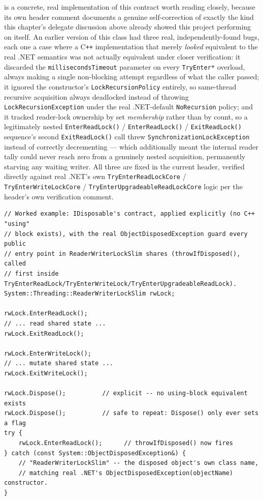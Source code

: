 is a concrete, real implementation of this
contract worth reading closely, because its own header comment documents a genuine
self-correction of exactly the kind this chapter's delegate discussion above already showed
this project performing on itself. An earlier version of this
class had three real, independently-found bugs, each one a case where a C\texttt{++}
implementation that merely \emph{looked} equivalent to the real .NET semantics was not
actually equivalent under closer verification: it discarded the
\texttt{millisecondsTimeout} parameter on every \texttt{TryEnter*} overload, always making a
single non-blocking attempt regardless of what the caller passed; it ignored the constructor's
\texttt{LockRecursionPolicy} entirely, so same-thread recursive acquisition always deadlocked
instead of throwing \texttt{LockRecursionException} under the real .NET-default
\texttt{NoRecursion} policy; and it tracked reader-lock ownership by set \emph{membership}
rather than by count, so a legitimately nested
\texttt{EnterReadLock()} / \texttt{EnterReadLock()} / \texttt{ExitReadLock()} sequence's second
\texttt{ExitReadLock()} call threw \texttt{SynchronizationLockException} instead of correctly
decrementing --- which additionally meant the internal reader tally could never reach zero
from a genuinely nested acquisition, permanently starving any waiting writer. All three are
fixed in the current header, verified directly against real .NET's own
\texttt{TryEnterReadLockCore} / \texttt{TryEnterWriteLockCore} / \texttt{TryEnterUpgradeableReadLockCore}
logic per the header's own verification comment.

\begin{lstlisting}
// Worked example: IDisposable's contract, applied explicitly (no C++ "using"
// block exists), with the real ObjectDisposedException guard every public
// entry point in ReaderWriterLockSlim shares (throwIfDisposed(), called
// first inside TryEnterReadLock/TryEnterWriteLock/TryEnterUpgradeableReadLock).
System::Threading::ReaderWriterLockSlim rwLock;

rwLock.EnterReadLock();
// ... read shared state ...
rwLock.ExitReadLock();

rwLock.EnterWriteLock();
// ... mutate shared state ...
rwLock.ExitWriteLock();

rwLock.Dispose();          // explicit -- no using-block equivalent exists
rwLock.Dispose();          // safe to repeat: Dispose() only ever sets a flag
try {
    rwLock.EnterReadLock();      // throwIfDisposed() now fires
} catch (const System::ObjectDisposedException&) {
    // "ReaderWriterLockSlim" -- the disposed object's own class name,
    // matching real .NET's ObjectDisposedException(objectName) constructor.
}
\end{lstlisting}


